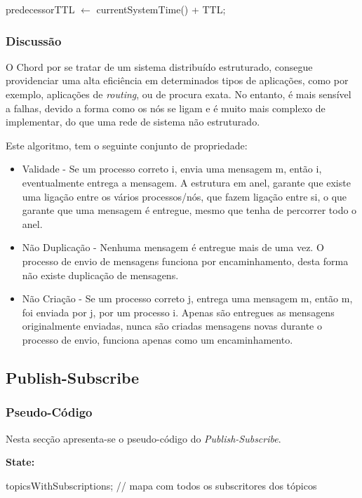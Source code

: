 \documentclass[12pt]{article}
\begin{document}
\qquad predecessorTTL $\leftarrow$ currentSystemTime() + TTL;


\subsubsection{Discussão}

O Chord por se tratar de um sistema distribuído estruturado, consegue providenciar uma alta eficiência em determinados tipos de aplicações, como por exemplo, aplicações de \emph{routing}, ou de procura exata. No entanto, é mais sensível a falhas, devido a forma como os nós se ligam e é muito mais complexo de implementar, do que uma rede de sistema não estruturado.

Este algoritmo, tem o seguinte conjunto de propriedade:

\begin{itemize}
\item Validade - Se um processo correto i, envia uma mensagem m, então i, eventualmente entrega a mensagem. A estrutura em anel, garante que existe uma ligação entre os vários processos/nós, que fazem ligação entre si, o que garante que uma mensagem é entregue, mesmo que tenha de percorrer todo o anel.
\item Não Duplicação - Nenhuma mensagem é entregue mais de uma vez. O processo de envio de mensagens funciona por encaminhamento, desta forma não existe duplicação de mensagens.
\item Não Criação - Se um processo correto j, entrega uma mensagem m, então m, foi enviada por j, por um processo i. Apenas são entregues as mensagens originalmente enviadas, nunca são criadas mensagens novas durante o processo de envio, funciona apenas como um encaminhamento.
\end{itemize}

\newpage
\subsection{Publish-Subscribe}

\subsubsection{Pseudo-Código}

Nesta secção apresenta-se o pseudo-código do \emph{Publish-Subscribe}.

\bigbreak
\textbf{State:}

\qquad topicsWithSubscriptions; // mapa com todos os subscritores dos tópicos
\end{document}
